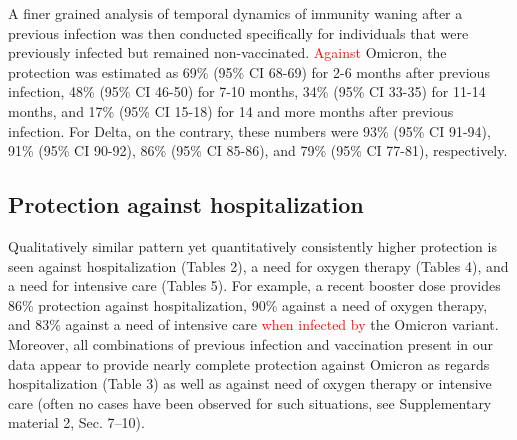 \documentclass[a4paper,12pt]{article}
\newcommand{\inputtable}[1]{ }
\newcommand{\inputtable}[1]{}
\def\tabHalone{2}
\def\tabHinteractions{3}
\def\tabOalone{4}
\def\tabUalone{5}
\newcommand{\new}[1]{\textcolor{red}{#1}}
\begin{document}
\inputtable{smid_protection_against_omicron_tab1.inc}

A finer grained analysis of temporal dynamics of immunity waning after a previous infection was then conducted specifically for individuals that were previously infected but remained non-vaccinated. \new{Against} Omicron, the protection was estimated as 69\% (95\% CI 68-69) for 2-6 months after previous infection,  48\% (95\% CI 46-50) for 7-10 months, 34\% (95\% CI 33-35) for 11-14 months, and 17\% (95\% CI 15-18) for 14 and more months after previous infection. For Delta, on the contrary, these numbers were 93\% (95\% CI 91-94), 91\% (95\% CI 90-92), 86\% (95\% CI 85-86), and 79\% (95\% CI 77-81), respectively.

\subsection*{Protection against hospitalization}

Qualitatively similar pattern yet quantitatively consistently higher protection is seen against hospitalization (Tables \tabHalone), a need for oxygen therapy (Tables \tabOalone), and a need for intensive care (Tables \tabUalone). 
For example, a recent booster dose provides 86\% protection against hospitalization, 90\% against a need of oxygen therapy, and 83\% against a need of intensive care \new{when infected by} the Omicron variant. Moreover, all combinations of previous infection and vaccination present in our data appear to provide nearly complete protection against Omicron as regards hospitalization (Table \tabHinteractions) as well as against need of oxygen therapy or intensive care (often no cases have been observed for such situations, see Supplementary material 2, Sec. 7--10).

\inputtable{smid_protection_against_omicron_tab2.inc}

\inputtable{smid_protection_against_omicron_tab3.inc}

\inputtable{smid_protection_against_omicron_tab4.inc}
\end{document}
